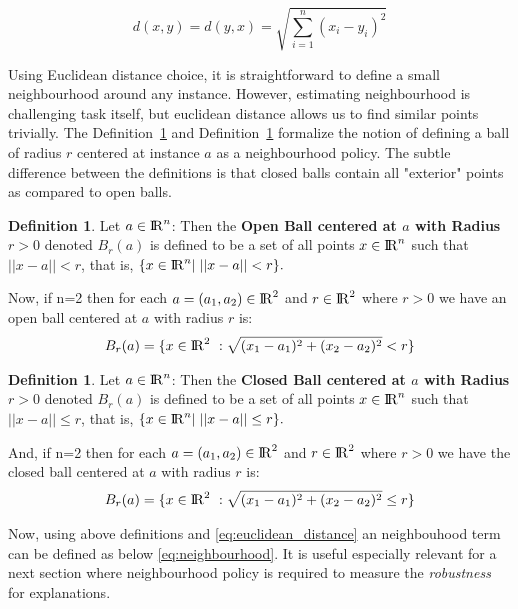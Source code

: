 \documentclass[english]{tktltiki2}
\theoremstyle{definition}
\newtheorem{definition}[thm]{Definition}
\theoremstyle{remark}
\begin{document}
\begin{equation}\label{eq:euclidean_distance}
d(x,y) = d(y,x) = \sqrt{\sum_{i=1}^{n}(x_i - y_i)^2}
\end{equation}

Using Euclidean distance choice, it is straightforward to define a small neighbourhood around any instance. However, estimating neighbourhood is challenging task itself, but euclidean distance allows us to find similar points trivially. The Definition~\ref{def:1} and Definition~\ref{def:2} formalize the notion of defining a ball of radius $r$ centered at instance $a$ as a neighbourhood policy. The subtle difference between the definitions is that closed balls contain all "exterior" points as compared to open balls.

\begin{definition}\label{def:1}{Let $a \in {\rm I\!R}^n$: Then the \textbf{Open Ball centered at $a$ with Radius $r > 0$} denoted $B_{r}(a)$ is defined to be a set of all points $x \in {\rm I\!R}^n$ such that $||x-a|| < r$, that is, $\{x \in {\rm I\!R}^n |\;||x - a|| < r\}.$}
\end{definition}
Now, if n=2 then for each $a = (a_1,a_2) \in {\rm I\!R}^2$ and $r \in {\rm I\!R}^2$ where $r > 0$ we have an open ball centered at $a$ with radius $r$ is:
\begin{align*}
B_{r}(a) = \{x \in {\rm I\!R}^2\ : \sqrt{(x_1 - a_1)^2 + (x_2 - a_2)^2} < r\}
\end{align*}

\begin{definition}\label{def:2}{Let $a \in {\rm I\!R}^n$: Then the \textbf{Closed Ball centered at $a$ with Radius $r > 0$} denoted $B_{r}(a)$ is defined to be a set of all points $x \in {\rm I\!R}^n$ such that $||x-a|| \leq r$, that is, $\{x \in {\rm I\!R}^n |\;||x - a|| \leq r\}.$}
\end{definition}
And, if n=2 then for each $a = (a_1,a_2) \in {\rm I\!R}^2$ and $r \in {\rm I\!R}^2$ where $r > 0$ we have the closed ball centered at $a$ with radius $r$ is:
\begin{align*}
B_{r}(a) = \{x \in {\rm I\!R}^2\ : \sqrt{(x_1 - a_1)^2 + (x_2 - a_2)^2} \leq r\}
\end{align*}

Now, using above definitions and \eqref{eq:euclidean_distance} an neighbouhood term can be defined as below \eqref{eq:neighbourhood}. It is useful especially relevant for a next section where neighbourhood policy is required to measure the \textit{robustness} for explanations. 
\end{document}
